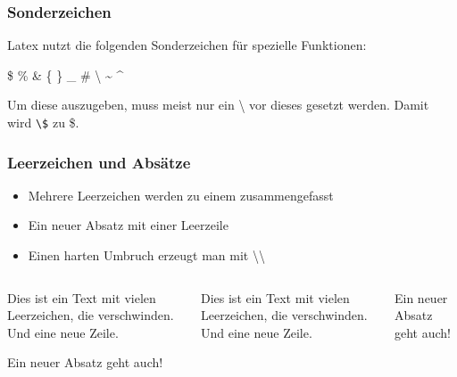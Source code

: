 \begin{frame}[fragile]
    \frametitle{Sonderzeichen}
    
    Latex nutzt die folgenden Sonderzeichen für spezielle Funktionen:
    \begin{center}
      \hfill \$
      \hfill \%
      \hfill \&
      \hfill \{
      \hfill \}
      \hfill \_
      \hfill \#
      \hfill \textbackslash
      \hfill \~{}
      \hfill \^{}
      \hfill
    \end{center}

    Um diese auszugeben, muss meist nur ein \textbackslash{} vor dieses gesetzt werden.
    Damit wird \verb+\$+ zu \$.
\end{frame}


\begin{frame}[fragile]
    \frametitle{Leerzeichen und Absätze}
    
    \begin{itemize}
        \item Mehrere Leerzeichen werden zu einem zusammengefasst \pause
        \item Ein neuer Absatz mit einer Leerzeile \pause
        \item Einen harten Umbruch erzeugt man mit \textbackslash\textbackslash
    \end{itemize}
    \pause    
    
    \begin{columns}[c]
            \begin{verbatim*}
Dies ist ein Text  mit
vielen   Leerzeichen, die
verschwinden.
Und eine neue  Zeile.

Ein neuer Absatz geht auch!
\end{verbatim*}
        \pause
        Dies ist ein Text  mit
        vielen   Leerzeichen, die
        verschwinden.
        Und eine neue  Zeile.

        Ein neuer Absatz geht auch!
\end{columns}
\end{frame}